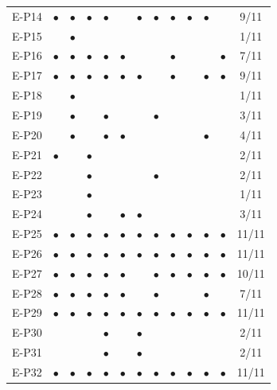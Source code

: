 \begin{longtable}{lccccccccccc c}
    E-P14 & $\bullet$ & $\bullet$ & $\bullet$ & $\bullet$ &  & $\bullet$ & $\bullet$ & $\bullet$ & $\bullet$ & $\bullet$ &  & 9/11 \\
    E-P15 &  & $\bullet$ &  &  &  &  &  &  &  &  &  & 1/11 \\
    E-P16 & $\bullet$ & $\bullet$ & $\bullet$ & $\bullet$ & $\bullet$ &  &  & $\bullet$ &  &  & $\bullet$ & 7/11 \\
    E-P17 & $\bullet$ & $\bullet$ & $\bullet$ & $\bullet$ & $\bullet$ & $\bullet$ &  & $\bullet$ &  & $\bullet$ & $\bullet$ & 9/11 \\
    E-P18 &  & $\bullet$ &  &  &  &  &  &  &  &  &  & 1/11 \\
    E-P19 &  & $\bullet$ &  & $\bullet$ &  &  & $\bullet$ &  &  &  &  & 3/11 \\
    E-P20 &  & $\bullet$ &  & $\bullet$ & $\bullet$ &  &  &  &  & $\bullet$ &  & 4/11 \\
    E-P21 & $\bullet$ &  & $\bullet$ &  &  &  &  &  &  &  &  & 2/11 \\
    E-P22 &  &  & $\bullet$ &  &  &  & $\bullet$ &  &  &  &  & 2/11 \\
    E-P23 &  &  & $\bullet$ &  &  &  &  &  &  &  &  & 1/11 \\
    E-P24 &  &  & $\bullet$ &  & $\bullet$ & $\bullet$ &  &  &  &  &  & 3/11 \\
    E-P25 & $\bullet$ & $\bullet$ & $\bullet$ & $\bullet$ & $\bullet$ & $\bullet$ & $\bullet$ & $\bullet$ & $\bullet$ & $\bullet$ & $\bullet$ & 11/11 \\
    E-P26 & $\bullet$ & $\bullet$ & $\bullet$ & $\bullet$ & $\bullet$ & $\bullet$ & $\bullet$ & $\bullet$ & $\bullet$ & $\bullet$ & $\bullet$ & 11/11 \\
    E-P27 & $\bullet$ & $\bullet$ & $\bullet$ & $\bullet$ & $\bullet$ &  & $\bullet$ & $\bullet$ & $\bullet$ & $\bullet$ & $\bullet$ & 10/11 \\
    E-P28 & $\bullet$ & $\bullet$ & $\bullet$ & $\bullet$ & $\bullet$ &  & $\bullet$ &  &  & $\bullet$ &  & 7/11 \\
    E-P29 & $\bullet$ & $\bullet$ & $\bullet$ & $\bullet$ & $\bullet$ & $\bullet$ & $\bullet$ & $\bullet$ & $\bullet$ & $\bullet$ & $\bullet$ & 11/11 \\
    E-P30 &  &  &  & $\bullet$ &  & $\bullet$ &  &  &  &  &  & 2/11 \\
    E-P31 &  &  &  & $\bullet$ &  & $\bullet$ &  &  &  &  &  & 2/11 \\
    E-P32 & $\bullet$ & $\bullet$ & $\bullet$ & $\bullet$ & $\bullet$ & $\bullet$ & $\bullet$ & $\bullet$ & $\bullet$ & $\bullet$ & $\bullet$ & 11/11 \\

\end{longtable}
